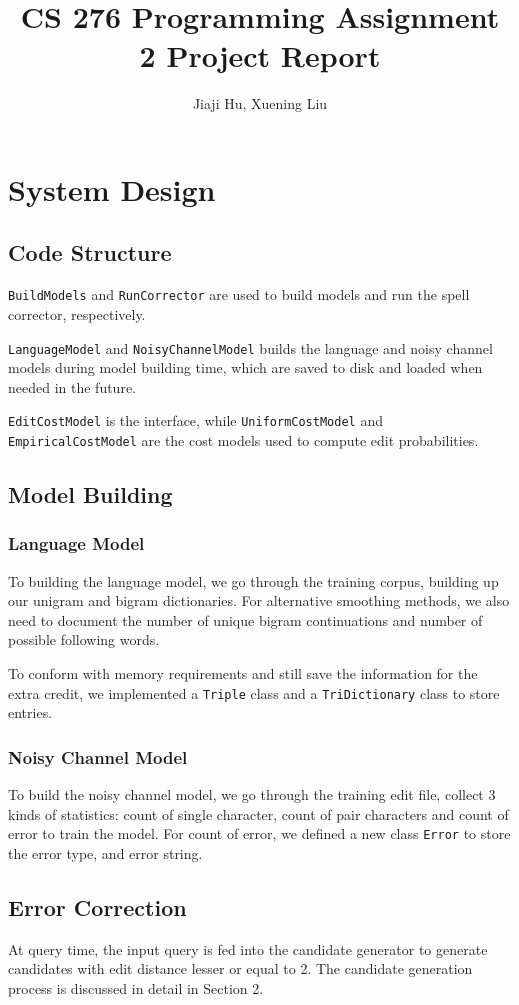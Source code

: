 \documentclass[10pt,twocolumn]{article}
\begin{document}
\title{CS 276 Programming Assignment 2 Project Report}
\author{Jiaji Hu, Xuening Liu}
\date{}
\maketitle
\section{System Design}
\subsection{Code Structure}
\texttt{BuildModels} and \texttt{RunCorrector} are used to build models and run the spell corrector, respectively.

\texttt{LanguageModel} and \texttt{NoisyChannelModel} builds the language and noisy channel models during model building time, which are saved to disk and loaded when needed in the future.

\texttt{EditCostModel} is the interface, while \texttt{UniformCostModel} and \texttt{EmpiricalCostModel} are the cost models used to compute edit probabilities.
\subsection{Model Building}
\subsubsection{Language Model}
To building the language model, we go through the training corpus, building up our unigram and bigram dictionaries. For alternative smoothing methods, we also need to document the number of unique bigram continuations and number of possible following words.

To conform with memory requirements and still save the information for the extra credit, we implemented a \texttt{Triple} class and a \texttt{TriDictionary} class to store entries.
\subsubsection{Noisy Channel Model}
To build the noisy channel model, we go through the training edit file, collect 3 kinds of statistics: count of single character, count of pair characters and count of error to train the model. For count of error, we defined a new class \texttt{Error} to store the error type, and error string.

\subsection{Error Correction}
At query time, the input query is fed into the candidate generator to generate candidates with edit distance lesser or equal to 2. The candidate generation process is discussed in detail in Section 2.
\end{document}
